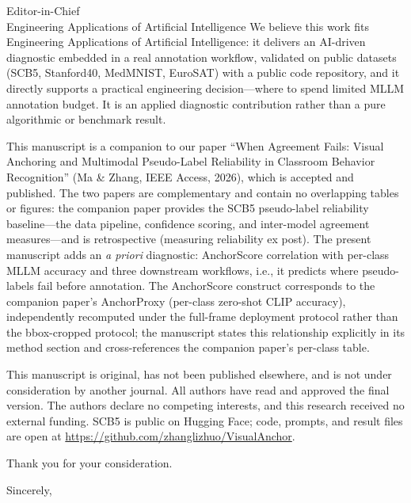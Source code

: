 \documentclass[10pt]{letter}
\begin{document}
\begin{letter}{Editor-in-Chief \\ Engineering Applications of Artificial Intelligence}
We believe this work fits Engineering Applications of Artificial Intelligence: it delivers an AI-driven diagnostic embedded in a real annotation workflow, validated on public datasets (SCB5, Stanford40, MedMNIST, EuroSAT) with a public code repository, and it directly supports a practical engineering decision---where to spend limited MLLM annotation budget. It is an applied diagnostic contribution rather than a pure algorithmic or benchmark result.

This manuscript is a companion to our paper ``When Agreement Fails: Visual Anchoring and Multimodal Pseudo-Label Reliability in Classroom Behavior Recognition'' (Ma \& Zhang, IEEE Access, 2026), which is accepted and published. The two papers are complementary and contain no overlapping tables or figures: the companion paper provides the SCB5 pseudo-label reliability baseline---the data pipeline, confidence scoring, and inter-model agreement measures---and is retrospective (measuring reliability ex post). The present manuscript adds an \emph{a priori} diagnostic: AnchorScore correlation with per-class MLLM accuracy and three downstream workflows, i.e., it predicts where pseudo-labels fail before annotation. The AnchorScore construct corresponds to the companion paper's AnchorProxy (per-class zero-shot CLIP accuracy), independently recomputed under the full-frame deployment protocol rather than the bbox-cropped protocol; the manuscript states this relationship explicitly in its method section and cross-references the companion paper's per-class table.

This manuscript is original, has not been published elsewhere, and is not under consideration by another journal. All authors have read and approved the final version. The authors declare no competing interests, and this research received no external funding. SCB5 is public on Hugging Face; code, prompts, and result files are open at \url{https://github.com/zhanglizhuo/VisualAnchor}.

Thank you for your consideration.

\closing{Sincerely,}

\end{letter}
\end{document}

